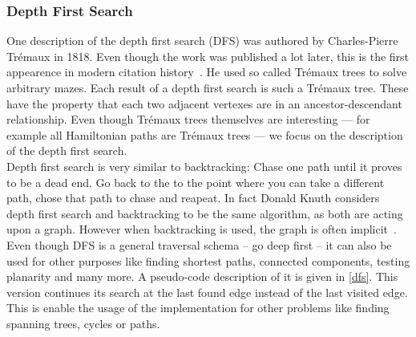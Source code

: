         \subsubsection*{Depth First Search}
        One description of the depth first search (DFS) was authored by Charles-Pierre Trémaux in 1818.
        Even though the work was published a lot later, this is the first appearence in modern citation history~\autocite{lucas1891recreations}. 
        He used so called Trémaux trees to solve arbitrary mazes. 
        Each result of a depth first search is such a Trémaux tree.
        These have the property that each two adjacent vertexes are in an ancestor-descendant relationship.
        Even though Trémaux trees themselves are interesting --- for example all Hamiltonian paths are Trémaux trees --- we focus on the description of the depth first search. \\
        
        Depth first search is very similar to backtracking: Chase one path until it proves to be a dead end. 
        Go back to the to the point where you can take a different path, chose that path to chase and reapeat. 
        In fact Donald Knuth considers depth first search and backtracking to be the same algorithm, as both are acting upon a graph. 
        However when backtracking is used, the graph is often implicit~\autocite{Knuth2000DancingL}.\\
        
        Even though DFS is a general traversal schema -- go deep first -- it can also be used for other purposes like finding shortest paths, connected components, testing planarity and many more. 
        A pseudo-code description of it is given in \ref{dfs}. 
        This version continues its search at the last found edge instead of the last visited edge. 
        This is enable the usage of the implementation for other problems like finding spanning trees, cycles or paths.
        
